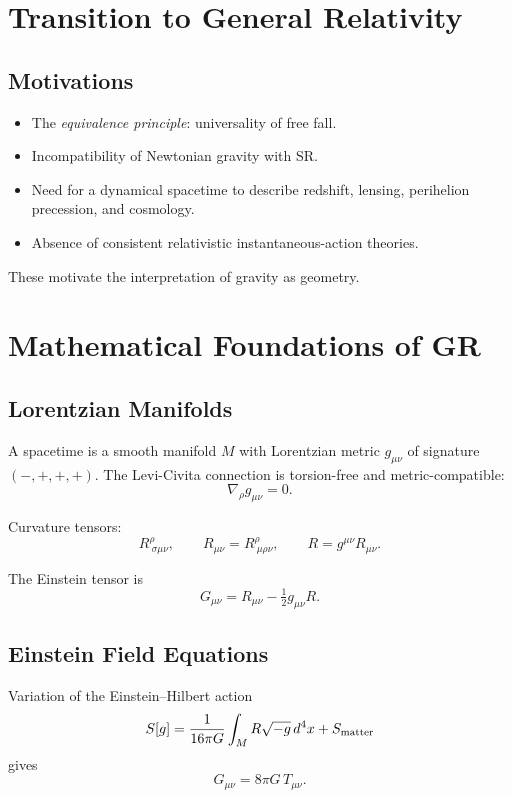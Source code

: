 \documentclass[12pt]{article}
\begin{document}
\section{Transition to General Relativity}

\subsection{Motivations}

\begin{itemize}
\item The \emph{equivalence principle}: universality of free fall.
\item Incompatibility of Newtonian gravity with SR.
\item Need for a dynamical spacetime to describe redshift, lensing, 
perihelion precession, and cosmology.
\item Absence of consistent relativistic instantaneous-action theories.
\end{itemize}

These motivate the interpretation of gravity as geometry.

\section{Mathematical Foundations of GR}

\subsection{Lorentzian Manifolds}

A spacetime is a smooth manifold $M$ with Lorentzian metric $g_{\mu\nu}$ 
of signature $(-,+,+,+)$. The Levi-Civita connection is torsion-free and 
metric-compatible:
\[
\nabla_\rho g_{\mu\nu}=0.
\]

Curvature tensors:
\[
R^\rho_{\ \sigma\mu\nu},\qquad 
R_{\mu\nu}=R^\rho_{\ \mu\rho\nu},\qquad 
R=g^{\mu\nu}R_{\mu\nu}.
\]

The Einstein tensor is
\[
G_{\mu\nu} = R_{\mu\nu} - \tfrac12 g_{\mu\nu}R.
\]

\subsection{Einstein Field Equations}

Variation of the Einstein--Hilbert action
\[
S[g]=\frac{1}{16\pi G}\int_M R\sqrt{-g}\, d^4x + S_{\rm matter}
\]
gives
\[
G_{\mu\nu}=8\pi G\, T_{\mu\nu}.
\]
\end{document}
